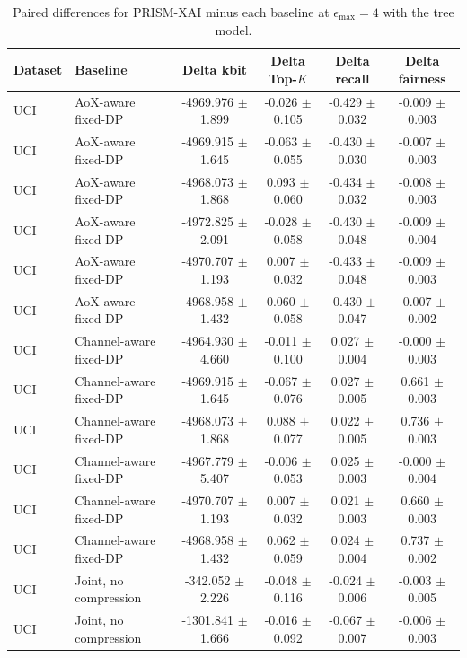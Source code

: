 \begin{table}[t]
\caption{Paired differences for PRISM-XAI minus each baseline at $\epsilon_{\max}=4$ with the tree model.}
\label{tab:paired-differences}
\centering
\scriptsize
\setlength{\tabcolsep}{3pt}
\begin{tabular}{llcccc}
\toprule
Dataset & Baseline & Delta kbit & Delta Top-$K$ & Delta recall & Delta fairness \\
\midrule
UCI & AoX-aware fixed-DP & -4969.976 $\pm$ 1.899 & -0.026 $\pm$ 0.105 & -0.429 $\pm$ 0.032 & -0.009 $\pm$ 0.003 \\
UCI & AoX-aware fixed-DP & -4969.915 $\pm$ 1.645 & -0.063 $\pm$ 0.055 & -0.430 $\pm$ 0.030 & -0.007 $\pm$ 0.003 \\
UCI & AoX-aware fixed-DP & -4968.073 $\pm$ 1.868 & 0.093 $\pm$ 0.060 & -0.434 $\pm$ 0.032 & -0.008 $\pm$ 0.003 \\
UCI & AoX-aware fixed-DP & -4972.825 $\pm$ 2.091 & -0.028 $\pm$ 0.058 & -0.430 $\pm$ 0.048 & -0.009 $\pm$ 0.004 \\
UCI & AoX-aware fixed-DP & -4970.707 $\pm$ 1.193 & 0.007 $\pm$ 0.032 & -0.433 $\pm$ 0.048 & -0.009 $\pm$ 0.003 \\
UCI & AoX-aware fixed-DP & -4968.958 $\pm$ 1.432 & 0.060 $\pm$ 0.058 & -0.430 $\pm$ 0.047 & -0.007 $\pm$ 0.002 \\
UCI & Channel-aware fixed-DP & -4964.930 $\pm$ 4.660 & -0.011 $\pm$ 0.100 & 0.027 $\pm$ 0.004 & -0.000 $\pm$ 0.003 \\
UCI & Channel-aware fixed-DP & -4969.915 $\pm$ 1.645 & -0.067 $\pm$ 0.076 & 0.027 $\pm$ 0.005 & 0.661 $\pm$ 0.003 \\
UCI & Channel-aware fixed-DP & -4968.073 $\pm$ 1.868 & 0.088 $\pm$ 0.077 & 0.022 $\pm$ 0.005 & 0.736 $\pm$ 0.003 \\
UCI & Channel-aware fixed-DP & -4967.779 $\pm$ 5.407 & -0.006 $\pm$ 0.053 & 0.025 $\pm$ 0.003 & -0.000 $\pm$ 0.004 \\
UCI & Channel-aware fixed-DP & -4970.707 $\pm$ 1.193 & 0.007 $\pm$ 0.032 & 0.021 $\pm$ 0.003 & 0.660 $\pm$ 0.003 \\
UCI & Channel-aware fixed-DP & -4968.958 $\pm$ 1.432 & 0.062 $\pm$ 0.059 & 0.024 $\pm$ 0.004 & 0.737 $\pm$ 0.002 \\
UCI & Joint, no compression & -342.052 $\pm$ 2.226 & -0.048 $\pm$ 0.116 & -0.024 $\pm$ 0.006 & -0.003 $\pm$ 0.005 \\
UCI & Joint, no compression & -1301.841 $\pm$ 1.666 & -0.016 $\pm$ 0.092 & -0.067 $\pm$ 0.007 & -0.006 $\pm$ 0.003 \\

\end{tabular}
\end{table}
